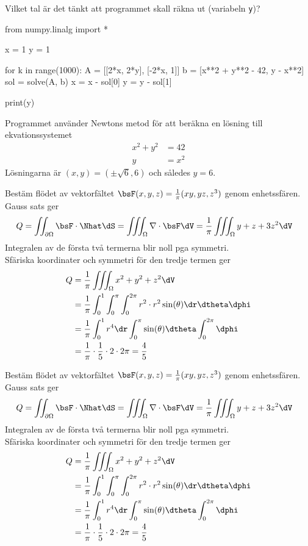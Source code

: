 Vilket tal är det tänkt att programmet skall räkna ut (variabeln \texttt{y})? \\
\begin{python}
from numpy.linalg import *

x = 1
y = 1

for k in range(1000):
    A = [[2*x, 2*y], [-2*x, 1]]
    b = [x**2 + y**2 - 42, y - x**2]
    sol = solve(A, b)
    x = x - sol[0]
    y = y - sol[1]

print(y)
\end{python}
Programmet använder Newtons metod för att beräkna en lösning till ekvationssystemet
\begin{align*}
  x^2 + y^2 &= 42 \\
  y &= x^2
\end{align*}
Lösningarna är $(x, y) = (\pm\sqrt{6}, 6)$ och således $y = 6$.
%

Bestäm flödet av vektorfältet $\bsF(x, y, z) = \frac{1}{\pi} (xy, yz, z^3)$
genom enhetssfären.
Gauss sats ger
\begin{align*}
  Q = \iint_{\partial\Omega} \bsF \cdot \Nhat \dS
  &= \iiint_{\Omega} \nabla \cdot \bsF \dV
    = \frac{1}{\pi} \iiint_{\Omega} y + z + 3z^2 \dV
\end{align*}
Integralen av de första två termerna blir noll pga symmetri. \\
Sfäriska koordinater och symmetri för den tredje termen ger
\begin{align*}
  Q &= \frac{1}{\pi} \iiint_{\Omega} x^2 + y^2 + z^2 \dV \\
    &= \frac{1}{\pi} \int_0^1 \int_0^{\pi} \int_0^{2\pi} r^2 \cdot
      r^2\sin(\theta)\dr\dtheta\dphi \\
    &= \frac{1}{\pi} \int_0^1 r^4 \dr \int_0^{\pi} \sin(\theta)
      \dtheta \int_0^{2\pi} \dphi \\
    &= \frac{1}{\pi} \cdot \frac{1}{5} \cdot 2 \cdot 2\pi
     = \frac{4}{5}
\end{align*}
%

Bestäm flödet av vektorfältet $\bsF(x, y, z) = \frac{1}{\pi} (xy, yz, z^3)$
genom enhetssfären.
Gauss sats ger
\begin{align*}
  Q = \iint_{\partial\Omega} \bsF \cdot \Nhat \dS
  &= \iiint_{\Omega} \nabla \cdot \bsF \dV
    = \frac{1}{\pi} \iiint_{\Omega} y + z + 3z^2 \dV
\end{align*}
Integralen av de första två termerna blir noll pga symmetri. \\
Sfäriska koordinater och symmetri för den tredje termen ger
\begin{align*}
  Q &= \frac{1}{\pi} \iiint_{\Omega} x^2 + y^2 + z^2 \dV \\
    &= \frac{1}{\pi} \int_0^1 \int_0^{\pi} \int_0^{2\pi} r^2 \cdot
      r^2\sin(\theta)\dr\dtheta\dphi \\
    &= \frac{1}{\pi} \int_0^1 r^4 \dr \int_0^{\pi} \sin(\theta)
      \dtheta \int_0^{2\pi} \dphi \\
    &= \frac{1}{\pi} \cdot \frac{1}{5} \cdot 2 \cdot 2\pi
     = \frac{4}{5}
\end{align*}
%

